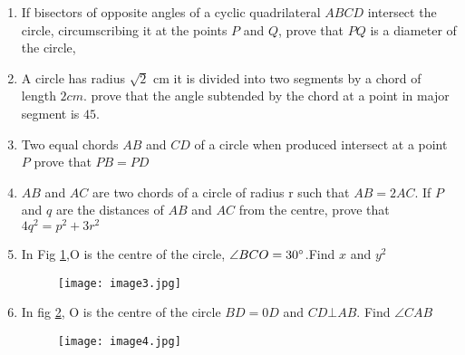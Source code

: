 \documentclass[12pt]{article}
\begin{document}
\begin{enumerate}
\item If bisectors of opposite angles of a cyclic quadrilateral $ABCD$ intersect the circle, circumscribing it at the points $P$ and $Q$, prove that $PQ$ is a diameter of the circle,
\item A circle has radius $\sqrt{2}$ cm it is divided into two segments by a chord of length $2cm$. prove that the angle subtended by the chord at a point in major segment is $45$.
\item Two equal chords $AB$ and $CD$ of a circle when produced intersect at a point $P$ prove that $PB=PD$
\item $AB$ and $AC$ are two chords of a circle of radius r such that $AB=2AC$. If $P$ and $q$ are the distances of $AB$ and $AC$ from the centre, prove that $4q^2=p^2+3r^2$
\item In Fig \ref{fig:3},O is the centre of the circle, $\angle BCO=30\degree$.Find $x$ and $y^2$
	\begin{figure}[h!]                        \begin{center}                                   \texttt{[image: image3.jpg]}                          \end{center}                            \caption{}                                       \label{fig:3}                    \end{figure}
	\item In fig \ref{fig:4}, O is the centre of the circle $BD=0D$ and $CD \bot AB$. Find $\angle CAB$
	\begin{figure}[h!]                        \begin{center}                                   \texttt{[image: image4.jpg]}                          \end{center}                            \caption{}                                       \label{fig:4}                    \end{figure}
\end{enumerate}

	
\end{document}
